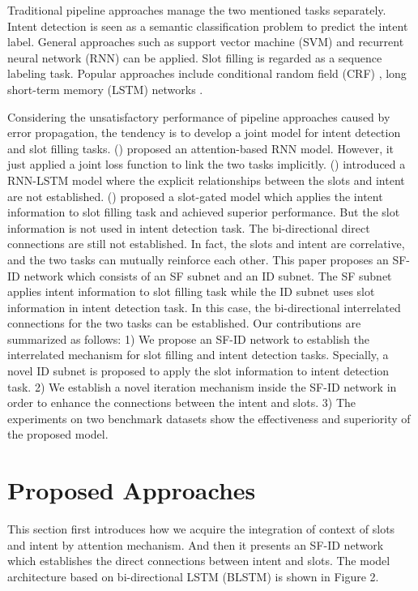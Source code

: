 \documentclass[11pt,a4paper]{article}
\begin{document}
Traditional pipeline approaches manage the two mentioned tasks separately. Intent detection is seen as a semantic classification problem to predict the intent label. General approaches such as support vector machine (SVM) \cite{haffner2003optimizing} and recurrent neural network (RNN) \cite{lai2015recurrent} can be applied. Slot filling is regarded as a sequence labeling task. Popular approaches include conditional random field (CRF) \cite{raymond2007generative}, long short-term memory (LSTM) networks \cite{yao2014spoken}.

Considering the unsatisfactory performance of pipeline approaches caused by error propagation, the tendency is to develop a joint model \cite{chen2016syntax,zhang2016joint} for intent detection and slot filling tasks. \citeauthor{liu2016attention} (\citeyear{liu2016attention}) proposed an attention-based RNN model. However, it just applied a joint loss function to link the two tasks implicitly. \citeauthor{hakkani2016multi} (\citeyear{hakkani2016multi}) introduced a RNN-LSTM model where the explicit relationships between the slots and intent are not established. \citeauthor{goo2018slot} (\citeyear{goo2018slot}) proposed a slot-gated model which applies the intent information to slot filling task and achieved superior performance. But the slot information is not used in intent detection task. The bi-directional direct connections are still not established. In fact, the slots and intent are correlative, and the two tasks can mutually reinforce each other. This paper proposes an SF-ID network which consists of an SF subnet and an ID subnet. The SF subnet applies intent information to slot filling task while the ID subnet uses slot information in intent detection task. In this case, the bi-directional interrelated connections for the two tasks can be established. Our contributions are summarized as follows: 1) We propose an SF-ID network to establish the interrelated mechanism for slot filling and intent detection tasks. Specially, a novel ID subnet is proposed to apply the slot information to intent detection task. 2) We establish a novel iteration mechanism inside the SF-ID network in order to enhance the connections between the intent and slots. 3) The experiments on two benchmark datasets show the effectiveness and superiority of the proposed model. 
\section{Proposed Approaches}
This section first introduces how we acquire the integration of context of slots and intent by attention mechanism. And then it presents an SF-ID network which establishes the direct connections between intent and slots. The model architecture based on bi-directional LSTM (BLSTM) is shown in Figure 2.
\end{document}
